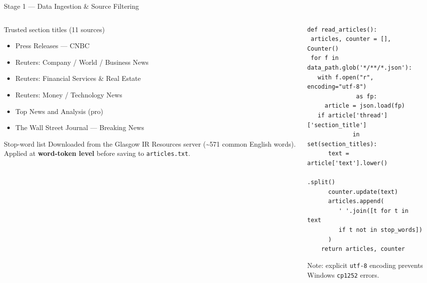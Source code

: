 \documentclass[11pt,aspectratio=169,professionalfonts]{beamer}
\begin{document}
\begin{frame}[fragile]{Stage 1 — Data Ingestion \& Source Filtering}
  \begin{columns}[T]
    \begin{column}{0.52\textwidth}
      \begin{block}{Trusted section titles (11 sources)}
        \begin{itemize}
          \item Press Releases — CNBC
          \item Reuters: Company / World / Business News
          \item Reuters: Financial Services \& Real Estate
          \item Reuters: Money / Technology News
          \item Top News and Analysis (pro)
          \item The Wall Street Journal — Breaking News
        \end{itemize}
      \end{block}
      \vspace{0.3em}
      \begin{block}{Stop-word list}
        \scriptsize
        Downloaded from the Glasgow IR Resources server
        (\textasciitilde571 common English words).
        Applied at \textbf{word-token level} before saving to
        \texttt{articles.txt}.
      \end{block}
    \end{column}
    \begin{column}{0.46\textwidth}
    \scriptsize
\begin{lstlisting}
def read_articles():
 articles, counter = [], Counter()
 for f in data_path.glob('*/**/*.json'):
   with f.open("r", encoding="utf-8") 
              as fp:
     article = json.load(fp)
   if article['thread']['section_title']
             in set(section_titles):
      text = article['text'].lower()
                            .split()
      counter.update(text)
      articles.append(
         ' '.join([t for t in text
         if t not in stop_words])
      )
    return articles, counter
\end{lstlisting}
      \vspace{0.2em}
      \alert{\scriptsize Note:} explicit \texttt{utf-8} encoding prevents
      Windows \texttt{cp1252} errors.
    \end{column}
  \end{columns}

\end{frame}
%
%
\end{document}

